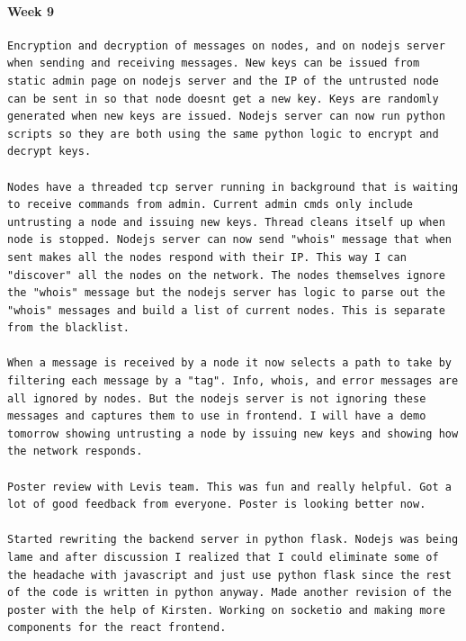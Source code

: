 \documentclass[draftclsnofoot, onecolumn, compsoc, 10pt]{IEEEtran}
\begin{document}
\paragraph{Week 9}
\begin{lstlisting}
Encryption and decryption of messages on nodes, and on nodejs server when sending and receiving messages. New keys can be issued from static admin page on nodejs server and the IP of the untrusted node can be sent in so that node doesnt get a new key. Keys are randomly generated when new keys are issued. Nodejs server can now run python scripts so they are both using the same python logic to encrypt and decrypt keys. 

Nodes have a threaded tcp server running in background that is waiting to receive commands from admin. Current admin cmds only include untrusting a node and issuing new keys. Thread cleans itself up when node is stopped. Nodejs server can now send "whois" message that when sent makes all the nodes respond with their IP. This way I can "discover" all the nodes on the network. The nodes themselves ignore the "whois" message but the nodejs server has logic to parse out the "whois" messages and build a list of current nodes. This is separate from the blacklist. 

When a message is received by a node it now selects a path to take by filtering each message by a "tag". Info, whois, and error messages are all ignored by nodes. But the nodejs server is not ignoring these messages and captures them to use in frontend. I will have a demo tomorrow showing untrusting a node by issuing new keys and showing how the network responds. 

Poster review with Levis team. This was fun and really helpful. Got a lot of good feedback from everyone. Poster is looking better now. 

Started rewriting the backend server in python flask. Nodejs was being lame and after discussion I realized that I could eliminate some of the headache with javascript and just use python flask since the rest of the code is written in python anyway. Made another revision of the poster with the help of Kirsten. Working on socketio and making more components for the react frontend.
\end{lstlisting}
\end{document}
